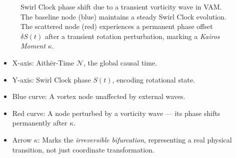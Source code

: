 \begin{figure}[H]
\centering


\caption{Swirl Clock phase shift due to a transient vorticity wave in VAM.
The baseline node (blue) maintains a steady Swirl Clock evolution.
The scattered node (red) experiences a permanent phase offset \( \delta S(t) \) after a transient rotation perturbation, marking a \emph{Kairos Moment} \( \kappa \).}
\label{fig:swirl_phase_shift}
\end{figure}

\begin{itemize}
\item X-axis: Aithēr-Time $\mathcal{N}$, the global causal time.
\item Y-axis: Swirl Clock phase $S(t)$, encoding rotational state.
\item Blue curve: A vortex node unaffected by external waves.
\item Red curve: A node perturbed by a vorticity wave — its phase shifts permanently after $\kappa$.
\item Arrow $\kappa$: Marks the \textit{irreversible bifurcation}, representing a real physical transition, not just coordinate transformation.
\end{itemize}



